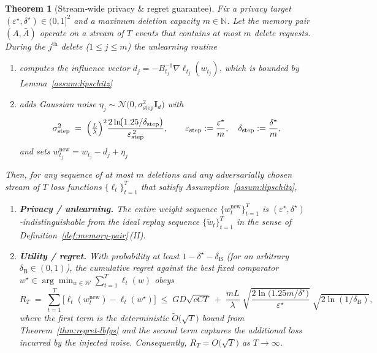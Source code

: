 \documentclass[a4paper,12pt]{article}
\newtheorem{theorem}{Theorem}[section]
\begin{document}
\begin{theorem}[Stream‑wide privacy \& regret guarantee]
\label{thm:comp-privacy-regret}
Fix a privacy target $(\varepsilon^{\star},\delta^{\star})\in(0,1]^{2}$ and a maximum deletion capacity $m\in\mathbb{N}$. Let the memory pair $(A,\bar A)$ operate on a stream of $T$ events that contains at most $m$ delete requests. During the $j^{\text{th}}$ delete ($1\le j\le m$) the unlearning routine

\begin{enumerate}
    \item computes the influence vector $d_{j} = -B_{t_{j}}^{-1}\nabla \ell_{t_{j}}(w_{t_{j}})$, which is bounded by Lemma~\ref{assum:lipschitz}
    \item adds Gaussian noise $\eta_j\sim\mathcal N\!\bigl(0,\sigma_{\text{step}}^2\mathbf I_d\bigr)$ with 
    \[
    \sigma_{\text{step}}^{2}
    \;=\;
    \Bigl(\tfrac{L}{\lambda}\Bigr)^2
    \frac{2\ln\!\bigl(1.25/\delta_{\text{step}}\bigr)}%
         {\varepsilon_{\text{step}}^{\,2}},
    \qquad
    \varepsilon_{\text{step}}:=\frac{\varepsilon^\star}{m},
    \quad
    \delta_{\text{step}}:=\frac{\delta^\star}{m},
  \]
    and sets $w_{t_j}^{\text{new}} = w_{t_j}-d_j+\eta_j$
\end{enumerate}

Then, for \emph{any} sequence of at most $m$ deletions and \emph{any}
adversarially chosen stream of $T$ loss functions
$\{\ell_t\}_{t=1}^{T}$ that satisfy Assumption~\ref{assum:lipschitz},

\begin{enumerate}
\item \textbf{Privacy / unlearning.}  
      The entire weight sequence $\{w_t^{\text{new}}\}_{t=1}^{T}$
      is $(\varepsilon^\star,\delta^\star)$‑indistinguishable
      from the ideal replay sequence
      $\{\tilde w_t\}_{t=1}^{T}$ in the sense of
      Definition~\ref{def:memory-pair}\,(II).

\item \textbf{Utility / regret.}  
      With probability at least
      $1-\delta^\star-\delta_{\mathrm{B}}$ (for an arbitrary
      $\delta_{\mathrm{B}}\!\in\!(0,1)$),
      the cumulative regret against the best fixed comparator
      $w^\star\in\arg\min_{w\in\mathcal W}\sum_{t=1}^{T}\ell_t(w)$ obeys
      \[
        R_T
        \;=\;
        \sum_{t=1}^{T}\bigl[\ell_t(w_t^{\text{new}})-\ell_t(w^\star)\bigr]
        \;\le\;
        GD\sqrt{cCT}
        \;+\;
        \frac{mL}{\lambda}\;
        \sqrt{\frac{2\ln\!\bigl(1.25m/\delta^\star\bigr)}%
                   {\varepsilon^\star}}\;
        \sqrt{2\ln(1/\delta_{\mathrm{B}})},
      \]
      where the first term is the deterministic
      $\tilde O\!\bigl(\sqrt{T}\bigr)$ bound from
      Theorem~\ref{thm:regret-lbfgs} and the second term captures the
      additional loss incurred by the injected noise.
      Consequently, $R_T = O\!\bigl(\sqrt{T}\bigr)$ as
      $T\!\to\!\infty$.
\end{enumerate}
\end{theorem}
\end{document}
